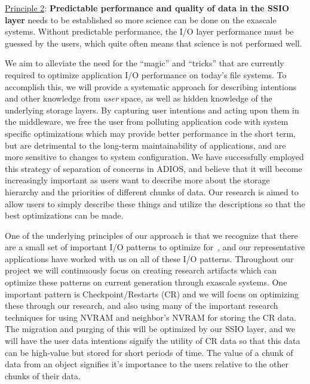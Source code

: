 \underline{Principle 2}: {\bf Predictable performance and quality of data in the SSIO layer} needs to be
established so more science can be done on the exascale systems. Without
predictable performance, the I/O layer performance must be guessed by the
users, which quite often means that science is not performed well.

We aim to alleviate the need for the ``magic'' and ``tricks''
that are currently required to optimize application I/O performance
on today's file systems. To accomplish this, we will provide a systematic
approach for describing intentions and other knowledge from {\it user}
space, as well as hidden knowledge of the underlying storage layers.
By capturing user intentions and acting upon them in the middleware, we
free the user from polluting application code with system specific
optimizations which may provide better performance in the short term,
but are detrimental to the long-term maintainability of applications, and
are more sensitive to changes to system configuration. We have successfully
employed this strategy of separation of concerns in ADIOS, and believe that
it will become increasingly important as users want to describe more about
the storage hierarchy and the priorities of different chunks of data. 
Our research is aimed to allow users to simply describe these things and
utilize the descriptions so that the best optimizations can be made.

One of the underlying principles of our approach is that we recognize that there are a small set
of important I/O patterns to optimize for~\cite{lofstead2011six,polte2009and,tian2011edo,tian2012system},
and our representative applications have worked with us on all of these I/O patterns. Throughout our project
we will continuously focus on creating research artifacts which can optimize these patterns on current generation through
exascale systems.  One important pattern is Checkpoint/Restarts (CR) and we will focus on optimizing these through our
research, and also using many of the important research techniques for using NVRAM and neighbor's NVRAM for storing 
the CR data. The migration and purging of this will be optimized by our SSIO layer, and we will have the user data intentions
signify the utility of CR data so that this data can be high-value but stored for short periods of time. The value of a chunk of data
from an object signifies it's importance to the users relative to the other chunks of their data.


